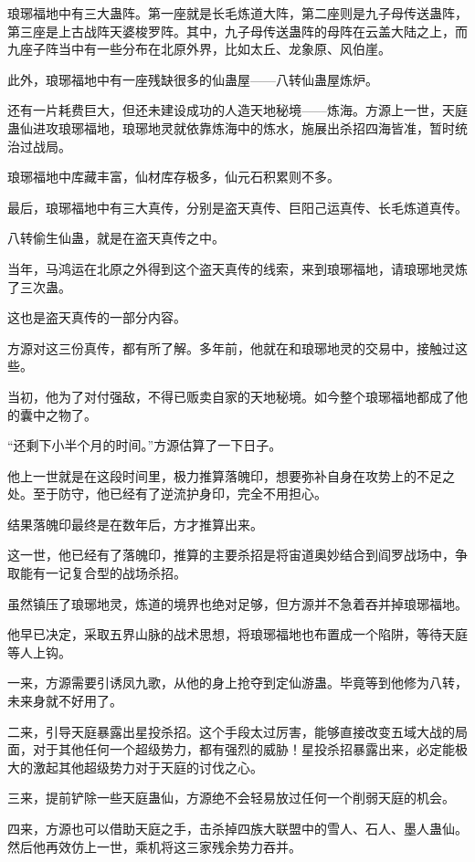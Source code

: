 \begin{this_body}
琅琊福地中有三大蛊阵。第一座就是长毛炼道大阵，第二座则是九子母传送蛊阵，第三座是上古战阵天婆梭罗阵。其中，九子母传送蛊阵的母阵在云盖大陆之上，而九座子阵当中有一些分布在北原外界，比如太丘、龙象原、风伯崖。

此外，琅琊福地中有一座残缺很多的仙蛊屋——八转仙蛊屋炼炉。

还有一片耗费巨大，但还未建设成功的人造天地秘境——炼海。方源上一世，天庭蛊仙进攻琅琊福地，琅琊地灵就依靠炼海中的炼水，施展出杀招四海皆准，暂时统治过战局。

琅琊福地中库藏丰富，仙材库存极多，仙元石积累则不多。

最后，琅琊福地中有三大真传，分别是盗天真传、巨阳己运真传、长毛炼道真传。

八转偷生仙蛊，就是在盗天真传之中。

当年，马鸿运在北原之外得到这个盗天真传的线索，来到琅琊福地，请琅琊地灵炼了三次蛊。

这也是盗天真传的一部分内容。

方源对这三份真传，都有所了解。多年前，他就在和琅琊地灵的交易中，接触过这些。

当初，他为了对付强敌，不得已贩卖自家的天地秘境。如今整个琅琊福地都成了他的囊中之物了。

“还剩下小半个月的时间。”方源估算了一下日子。

他上一世就是在这段时间里，极力推算落魄印，想要弥补自身在攻势上的不足之处。至于防守，他已经有了逆流护身印，完全不用担心。

结果落魄印最终是在数年后，方才推算出来。

这一世，他已经有了落魄印，推算的主要杀招是将宙道奥妙结合到阎罗战场中，争取能有一记复合型的战场杀招。

虽然镇压了琅琊地灵，炼道的境界也绝对足够，但方源并不急着吞并掉琅琊福地。

他早已决定，采取五界山脉的战术思想，将琅琊福地也布置成一个陷阱，等待天庭等人上钩。

一来，方源需要引诱凤九歌，从他的身上抢夺到定仙游蛊。毕竟等到他修为八转，未来身就不好用了。

二来，引导天庭暴露出星投杀招。这个手段太过厉害，能够直接改变五域大战的局面，对于其他任何一个超级势力，都有强烈的威胁！星投杀招暴露出来，必定能极大的激起其他超级势力对于天庭的讨伐之心。

三来，提前铲除一些天庭蛊仙，方源绝不会轻易放过任何一个削弱天庭的机会。

四来，方源也可以借助天庭之手，击杀掉四族大联盟中的雪人、石人、墨人蛊仙。然后他再效仿上一世，乘机将这三家残余势力吞并。


\end{this_body}
